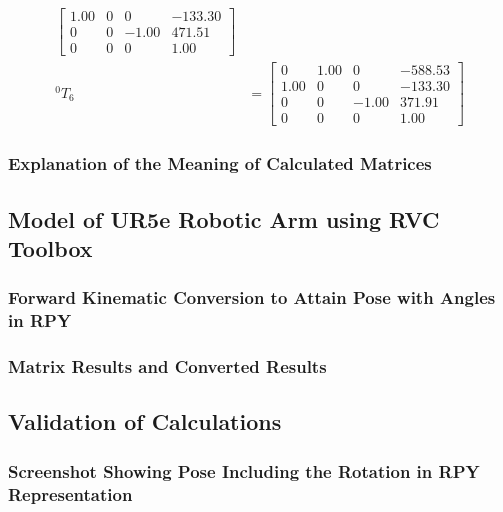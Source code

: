\begin{equation*}
\begin{split}
\begin{bmatrix}
                          1.00 & 0    & 0     & -133.30 \\
                          0    & 0    & -1.00 & 471.51  \\
                          0    & 0    & 0     & 1.00
                      \end{bmatrix}   \\
        ^{0}T_{6} & = \begin{bmatrix}
                          0    & 1.00 & 0     & -588.53 \\
                          1.00 & 0    & 0     & -133.30 \\
                          0    & 0    & -1.00 & 371.91  \\
                          0    & 0    & 0     & 1.00
                      \end{bmatrix}
    \end{split}
\end{equation*}
\subsubsection{Explanation of the Meaning of Calculated Matrices}



\subsection{Model of UR5e Robotic Arm using RVC Toolbox}
\subsubsection{Forward Kinematic Conversion to Attain Pose with Angles in RPY}
\subsubsection{Matrix Results and Converted Results}
\subsection{Validation of Calculations}
\subsubsection{Screenshot Showing Pose Including the Rotation in RPY Representation}
